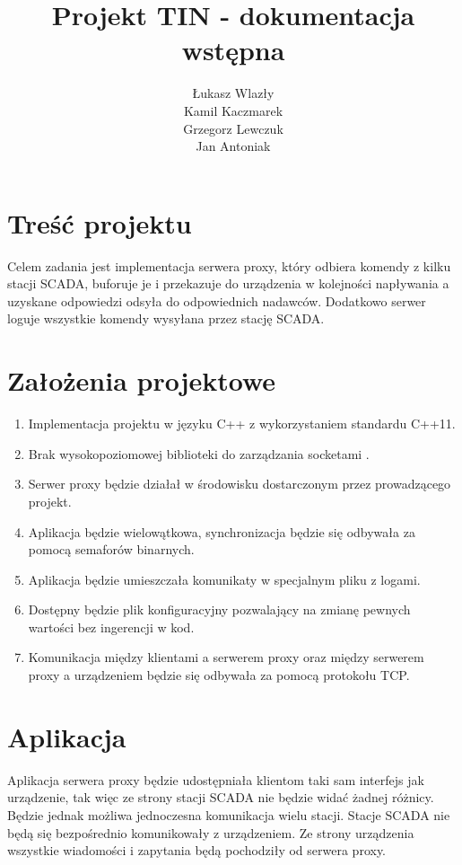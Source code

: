 \documentclass[a4paper]{article}
\title{Projekt TIN - dokumentacja wstępna}
\author{Łukasz Wlazły\\Kamil Kaczmarek\\Grzegorz Lewczuk\\Jan Antoniak}
\date{}
\begin{document}
\maketitle


\section{Treść projektu}

Celem zadania jest implementacja serwera proxy, który odbiera komendy z kilku stacji SCADA, buforuje je i przekazuje do urządzenia w kolejności napływania a uzyskane odpowiedzi odsyła do odpowiednich nadawców. Dodatkowo serwer loguje wszystkie komendy wysyłana przez stację SCADA.


\section{Założenia projektowe}

\begin{enumerate}
\item Implementacja projektu w języku C++ z wykorzystaniem standardu C++11.
\item Brak wysokopoziomowej biblioteki do zarządzania socketami .
\item Serwer proxy będzie działał w środowisku dostarczonym przez prowadzącego projekt.
\item Aplikacja będzie wielowątkowa, synchronizacja będzie się odbywała za pomocą semaforów binarnych.
\item Aplikacja będzie umieszczała komunikaty w specjalnym pliku z logami.
\item Dostępny będzie plik konfiguracyjny pozwalający na zmianę pewnych wartości bez ingerencji w kod.
\item Komunikacja między klientami a serwerem proxy oraz między serwerem proxy a urządzeniem będzie się odbywała za pomocą protokołu TCP.
\end{enumerate}


\section{Aplikacja}

Aplikacja serwera proxy będzie udostępniała klientom taki sam interfejs jak urządzenie, tak więc ze strony stacji SCADA nie będzie widać żadnej różnicy. Będzie jednak możliwa jednoczesna komunikacja wielu stacji. Stacje SCADA nie będą się bezpośrednio komunikowały z urządzeniem. Ze strony urządzenia wszystkie wiadomości i zapytania będą pochodziły od serwera proxy.
\end{document}
